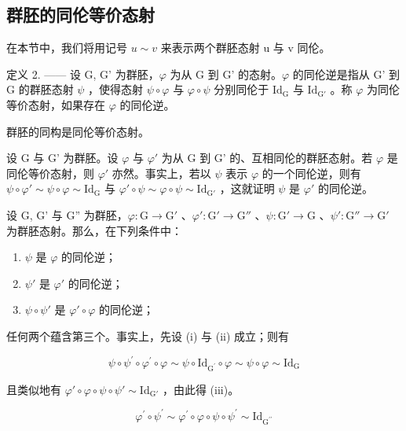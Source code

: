 \subsection{群胚的同伦等价态射}

在本节中，我们将用记号 \(u \sim v\) 来表示两个群胚态射 u 与 v 同伦。

定义 2. —— 设 G, G' 为群胚，\(\varphi\) 为从 G 到 G' 的态射。\(\varphi\) 的同伦逆是指从 G' 到 G 的群胚态射 \(\psi\) ，使得态射 \(\psi \circ \varphi\) 与 \(\varphi \circ \psi\) 分别同伦于 \(\mathrm{Id}_{\mathrm{G}}\) 与 \(\mathrm{Id}_{\mathrm{G}'}\) 。称 \(\varphi\) 为同伦等价态射，如果存在 \(\varphi\) 的同伦逆。

群胚的同构是同伦等价态射。

设 G 与 G' 为群胚。设 \(\varphi\) 与 \(\varphi'\) 为从 G 到 G' 的、互相同伦的群胚态射。若 \(\varphi\) 是同伦等价态射，则 \(\varphi'\) 亦然。事实上，若以 \(\psi\) 表示 \(\varphi\) 的一个同伦逆，则有 \(\psi \circ \varphi' \sim \psi \circ \varphi \sim \mathrm{Id}_{\mathrm{G}}\) 与 \(\varphi' \circ \psi \sim \varphi \circ \psi \sim \mathrm{Id}_{\mathrm{G}'}\) ，这就证明 \(\psi\) 是 \(\varphi'\) 的同伦逆。

设 G, G' 与 G'' 为群胚，\(\varphi\colon\mathrm{G}\to\mathrm{G}'\) 、\(\varphi'\colon\mathrm{G}'\to\mathrm{G}''\) 、\(\psi\colon\mathrm{G}'\to\mathrm{G}\) 、\(\psi'\colon\mathrm{G}''\to\mathrm{G}'\) 为群胚态射。那么，在下列条件中：

\begin{enumerate}
\def\labelenumi{(\roman{enumi})}
\item
  \(\psi\) 是 \(\varphi\) 的同伦逆；
\item
  \(\psi'\) 是 \(\varphi'\) 的同伦逆；
\item
  \(\psi \circ \psi'\) 是 \(\varphi' \circ \varphi\) 的同伦逆；
\end{enumerate}

任何两个蕴含第三个。事实上，先设 (i) 与 (ii) 成立；则有

\[
\psi \circ \psi^ {\prime} \circ \varphi^ {\prime} \circ \varphi \sim \psi \circ \mathrm{Id} _ {\mathrm{G} ^ {\prime}} \circ \varphi \sim \psi \circ \varphi \sim \mathrm{Id} _ {\mathrm{G}}
\]

且类似地有 \(\varphi' \circ \varphi \circ \psi \circ \psi' \sim \mathrm{Id}_{\mathrm{G}'}\) ，由此得 (iii)。

\[
\varphi^ {\prime} \circ \psi^ {\prime} \sim \varphi^ {\prime} \circ \varphi \circ \psi \circ \psi^ {\prime} \sim \mathrm{Id} _ {\mathrm{G} ^ {\prime \prime}}
\]

